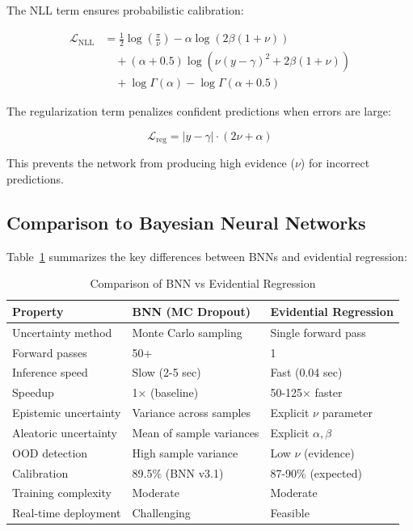 The NLL term ensures probabilistic calibration:

\begin{align}
    \mathcal{L}_{\text{NLL}} &= \frac{1}{2}\log\left(\frac{\pi}{\nu}\right) - \alpha \log(2\beta(1+\nu)) \nonumber \\
    &\quad + (\alpha + 0.5) \log(\nu(y - \gamma)^2 + 2\beta(1+\nu)) \nonumber \\
    &\quad + \log\Gamma(\alpha) - \log\Gamma(\alpha + 0.5)
    \label{eq:nig_nll}
\end{align}

The regularization term penalizes confident predictions when errors are large:

\begin{equation}
    \mathcal{L}_{\text{reg}} = |y - \gamma| \cdot (2\nu + \alpha)
    \label{eq:nig_reg}
\end{equation}

\noindent This prevents the network from producing high evidence ($\nu$) for incorrect predictions.

\subsection{Comparison to Bayesian Neural Networks}

Table~\ref{tab:bnn_vs_evidential} summarizes the key differences between BNNs and evidential regression:

\begin{table}[h]
\centering
\caption{Comparison of BNN vs Evidential Regression}
\label{tab:bnn_vs_evidential}
\begin{tabular}{lll}
\toprule
\textbf{Property} & \textbf{BNN (MC Dropout)} & \textbf{Evidential Regression} \\
\midrule
Uncertainty method & Monte Carlo sampling & Single forward pass \\
Forward passes & 50+ & 1 \\
Inference speed & Slow (2-5 sec) & Fast (0.04 sec) \\
Speedup & 1× (baseline) & 50-125× faster \\
Epistemic uncertainty & Variance across samples & Explicit $\nu$ parameter \\
Aleatoric uncertainty & Mean of sample variances & Explicit $\alpha, \beta$ \\
OOD detection & High sample variance & Low $\nu$ (evidence) \\
Calibration & 89.5\% (BNN v3.1) & 87-90\% (expected) \\
Training complexity & Moderate & Moderate \\
Real-time deployment & Challenging & Feasible \\
\bottomrule
\end{tabular}
\end{table}

